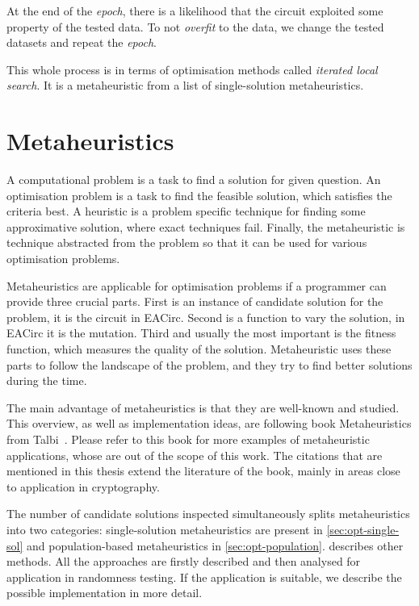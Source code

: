 \documentclass[
  print, %
  Table,   %
  nolof,     %
  nolot,     %
  11pt, %
  oneside  %
]{fithesis3}
\begin{document}
At the end of the \textit{epoch}, there is a likelihood that the circuit exploited some property of the tested data. To not \textit{overfit} to the data, we change the tested datasets and repeat the \textit{epoch}.

This whole process is in terms of optimisation methods called \textit{iterated local search}. It is a metaheuristic from a list of single-solution metaheuristics.


\chapter{Metaheuristics}
\label{chap:metaheuristics}

A computational problem is a task to find a solution for given question. An optimisation problem is a task to find the feasible solution, which satisfies the criteria best. A heuristic is a problem specific technique for finding some approximative solution, where exact techniques fail. Finally, the metaheuristic is technique abstracted from the problem so that it can be used for various optimisation problems.

Metaheuristics are applicable for optimisation problems if a programmer can provide three crucial parts. First is an instance of candidate solution for the problem, it is the circuit in EACirc. Second is a function to vary the solution, in EACirc it is the mutation. Third and usually the most important is the fitness function, which measures the quality of the solution. Metaheuristic uses these parts to follow the landscape of the problem, and they try to find better solutions during the time.

The main advantage of metaheuristics is that they are well-known and studied. This overview, as well as implementation ideas, are following book Metaheuristics from Talbi~\cite{talbi2009metaheuristics}. Please refer to this book for more examples of metaheuristic applications, whose are out of the scope of this work. The citations that are mentioned in this thesis extend the literature of the book, mainly in areas close to application in cryptography.

The number of candidate solutions inspected simultaneously splits metaheuristics into two categories: single-solution metaheuristics are present in \cref{sec:opt-single-sol} and population-based metaheuristics in \cref{sec:opt-population}.  describes other methods. All the approaches are firstly described and then analysed for application in randomness testing. If the application is suitable, we describe the possible implementation in more detail.
\end{document}
